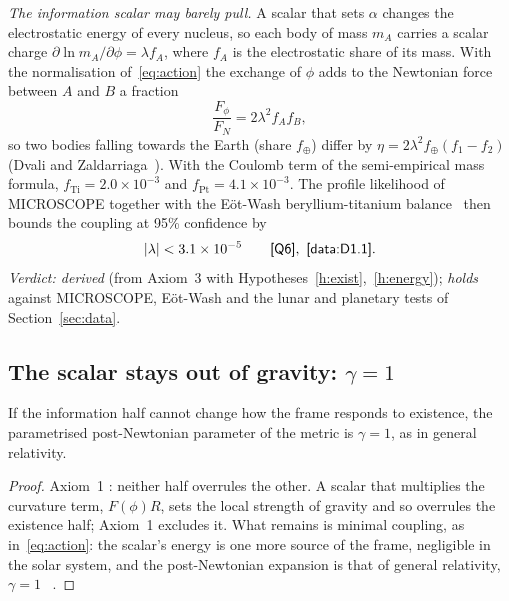 \emph{The information scalar may barely pull.} A scalar that sets $\alpha$ changes the electrostatic energy of every nucleus, so each body
of mass $m_A$ carries a scalar charge $\partial\ln m_A/\partial\phi=\lambda f_A$, where $f_A$ is the electrostatic share of its mass. With the
normalisation of~\eqref{eq:action} the exchange of $\phi$ adds to the Newtonian force between $A$ and $B$ a fraction
\begin{equation}\label{eq:fifth}
\frac{F_\phi}{F_N}=2\lambda^2f_Af_B ,
\end{equation}
so two bodies falling towards the Earth (share $f_\oplus$) differ by $\eta=2\lambda^2f_\oplus(f_1-f_2)$ (Dvali and Zaldarriaga~\cite{dz}).
With the Coulomb term of the semi-empirical mass formula, $f_{\text{Ti}}=2.0\times10^{-3}$ and $f_{\text{Pt}}=4.1\times10^{-3}$. The
profile likelihood of MICROSCOPE together with the E\"ot-Wash beryllium-titanium balance~\cite{schlamminger2008} then bounds the coupling
at 95\% confidence by
\begin{equation}\label{eq:lambdabound}
|\lambda|<3.1\times10^{-5}\qquad\textsf{[Q6]},\ \textsf{[data:D1.1]}.
\end{equation}
\emph{Verdict: derived} (from Axiom~3 with Hypotheses~\ref{h:exist},~\ref{h:energy}); \emph{holds} against
MICROSCOPE, E\"ot-Wash and the lunar and planetary tests of Section~\ref{sec:data}.

\subsection{The scalar stays out of gravity: \texorpdfstring{$\gamma=1$}{gamma = 1}}

\begin{proposition}\label{pr:gamma}
If the information half cannot change how the frame responds to existence, the parametrised post-Newtonian parameter of the
metric is $\gamma=1$, as in general relativity.
\end{proposition}

\begin{proof}
Axiom~1 \tagD: neither half overrules the other. A scalar that multiplies the curvature term, $F(\phi)R$, sets the local strength of gravity
and so overrules the existence half; Axiom~1 excludes it. What remains is minimal coupling, as in~\eqref{eq:action}: the scalar's energy is
one more source of the frame, negligible in the solar system, and the post-Newtonian expansion is that of general relativity,
$\gamma=1$~\cite{will} \tagP.
\end{proof}

